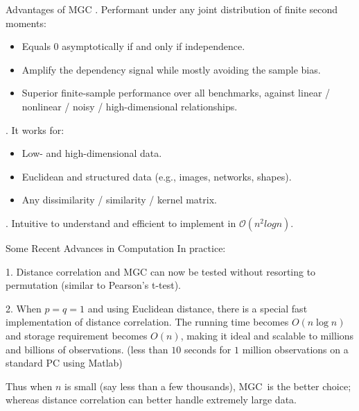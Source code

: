 \documentclass[mathserif,t]{beamer}
\newcommand{\Mgc}{MGC}
\begin{document}
\begin{frame}{Advantages of \Mgc}
. Performant under any joint distribution of finite second moments:
\pause
\begin{itemize}[<+->]
\item Equals $0$ asymptotically if and only if independence.
\item \textcolor{UniOrange}{Amplify the dependency signal while mostly avoiding the sample bias.} 
\item Superior finite-sample performance over all benchmarks, against linear / nonlinear / noisy / high-dimensional relationships. 
\end{itemize}

\pause
{}. It works for:
\pause
\begin{itemize}[<+->]
\item Low- and high-dimensional data.
\item Euclidean and structured data (e.g., images, networks, shapes).
\item Any dissimilarity / similarity / kernel matrix.
\end{itemize}

\pause
{}. Intuitive to understand and efficient to implement in $\mathcal{O}(n^2 log n)$.

\end{frame}

\begin{frame}{Some Recent Advances in Computation}
In practice:
\pause
\medskip
\medskip

1. Distance correlation and MGC can now be tested without resorting to permutation (similar to Pearson's t-test).
\pause
\medskip
\medskip

2. When $p=q=1$ and using Euclidean distance, there is a special fast implementation of distance correlation. The running time becomes $O(n \log n)$ and storage requirement becomes $O(n)$, making it ideal and scalable to millions and billions of observations. (less than $10$ seconds for $1$ million observations on a standard PC using Matlab)
\pause
\medskip
\medskip

Thus when $n$ is small (say less than a few thousands), \Mgc~is the better choice; whereas distance correlation can better handle extremely large data.
\end{frame}
\end{document}
